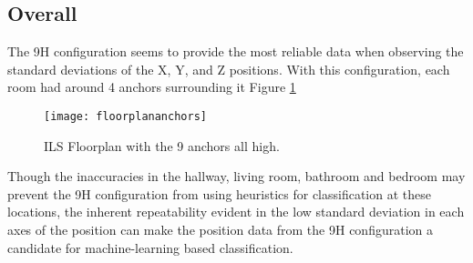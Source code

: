 \subsection{Overall}
The 9H configuration seems to provide the most reliable data when observing
the standard deviations of the X, Y, and Z positions. With this configuration,
each room had around 4 anchors surrounding it Figure \ref{fig:anchorplacement}

\begin{figure}[ht]
    \centering
    \texttt{[image: floorplananchors]}
    \caption{ILS Floorplan with the 9 anchors all high.}
    \label{fig:anchorplacement}
\end{figure}

Though the inaccuracies in the hallway, living room, bathroom and bedroom may
prevent the 9H configuration from using heuristics for classification at these 
locations, the inherent repeatability evident in the low standard deviation in 
each axes of the position can make the position data from the 9H configuration
a candidate for machine-learning based classification. 
